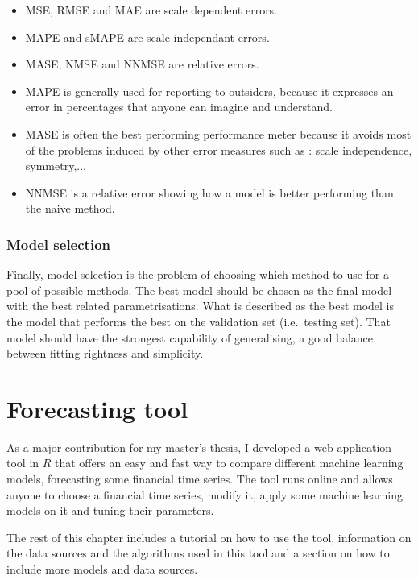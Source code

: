 \documentclass[11pt,a4paper,oneside]{book}
\begin{document}
\begin{itemize}
    \item MSE, RMSE and MAE are scale dependent errors.
    \item MAPE and sMAPE are scale independant errors.
    \item MASE, NMSE and NNMSE are relative errors.
    \item MAPE is generally used for reporting to outsiders, because it expresses an error in percentages that anyone can imagine and understand.
    \item MASE is often the best performing performance meter because it avoids most of the problems induced by other error measures such as : scale independence, symmetry,... 
    \item NNMSE is a relative error showing how a model is better performing than the naive method. 
\end{itemize}



\subsection{Model selection}

Finally, model selection is the problem of choosing which method to use for a pool of possible methods. The best model should be chosen as the final model with the best related parametrisations. What is described as the best model is the model that performs the best on the validation set (i.e.\ testing set). That model should have the strongest capability of generalising, a good balance between fitting rightness and simplicity. \cite{BenTaieb}





\chapter{Forecasting tool}\label{tool}

As a major contribution for my master's thesis, I developed a web application tool in \textbf{$R$} that offers an easy and fast way to compare different machine learning models, forecasting some financial time series. The tool runs online and allows anyone to choose a financial time series, modify it, apply some machine learning models on it and tuning their parameters. 

The rest of this chapter includes a tutorial on how to use the tool, information on the data sources and the algorithms used in this tool and a section on how to include more models and data sources. 
\end{document}
